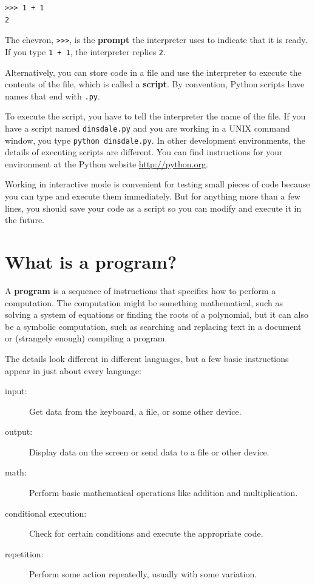 \documentclass[10pt]{book}
\begin{document}
\begin{verbatim}
>>> 1 + 1
2
\end{verbatim}
%
The chevron, \verb">>>", is the
{\bf prompt} the interpreter uses to indicate that it is ready.  If
you type {\tt 1 + 1}, the interpreter replies {\tt 2}.

Alternatively, you can store code in a file and use the interpreter to
execute the contents of the file, which is called a {\bf script}.  By
convention, Python scripts have names that end with {\tt .py}.

To execute the script, you have to tell the interpreter the name of
the file.  If you have a script named {\tt dinsdale.py} and you are
working in a UNIX command window, you type {\tt python
dinsdale.py}.  In other development environments, the details of
executing scripts are different.  You can find instructions for
your environment at the Python website \url{http://python.org}.

Working in interactive mode is convenient for testing small pieces of
code because you can type and execute them immediately.  But for
anything more than a few lines, you should save your code
as a script so you can modify and execute it in the future.


\section{What is a program?}

A {\bf program} is a sequence of instructions that specifies how to
perform a computation.  The computation might be something
mathematical, such as solving a system of equations or finding the
roots of a polynomial, but it can also be a symbolic computation, such
as searching and replacing text in a document or (strangely enough)
compiling a program.

The details look different in different languages, but a few basic
instructions appear in just about every language:

\begin{description}

\item[input:] Get data from the keyboard, a file, or some
other device.

\item[output:] Display data on the screen or send data to a
file or other device.

\item[math:] Perform basic mathematical operations like addition and
multiplication.

\item[conditional execution:] Check for certain conditions and
execute the appropriate code.

\item[repetition:] Perform some action repeatedly, usually with
some variation.

\end{description}
\end{document}
